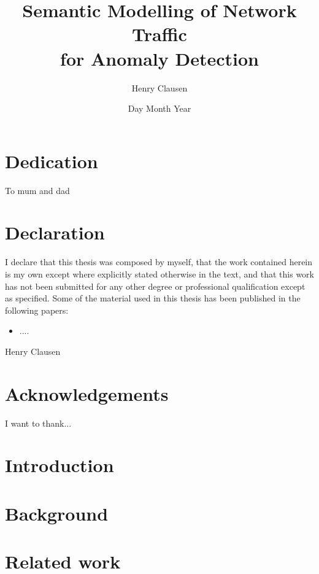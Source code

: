 \documentclass[a4paper,12pt,twoside]{report}
\title{
{Semantic Modelling of Network Traffic\\ for Anomaly Detection}\\
}
\author{Henry Clausen}
\date{Day Month Year}
\begin{document}




\chapter*{Dedication}
To mum and dad

\chapter*{Declaration}

I declare that this thesis was composed by myself, that the work contained herein is my own except where explicitly stated otherwise in the text, and that this work has not been submitted for any other degree or professional qualification except as specified. Some of the material used in this thesis has been published in the following papers:

\begin{itemize}
\item ....
\end{itemize}

\hspace*{0pt}\hfill Henry Clausen

\chapter*{Acknowledgements}
I want to thank...

\tableofcontents

\chapter{Introduction}


\chapter{Background}


\chapter{Related work}

\end{document}
